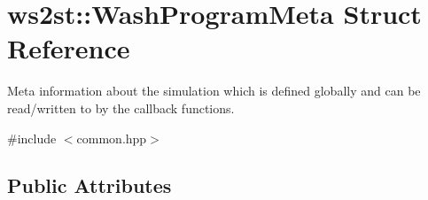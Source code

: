 \hypertarget{structws2st_1_1WashProgramMeta}{}\section{ws2st\+:\+:Wash\+Program\+Meta Struct Reference}
\label{structws2st_1_1WashProgramMeta}


Meta information about the simulation which is defined globally and can be read/written to by the callback functions.  




{\ttfamily \#include $<$common.\+hpp$>$}

\subsection*{Public Attributes}
